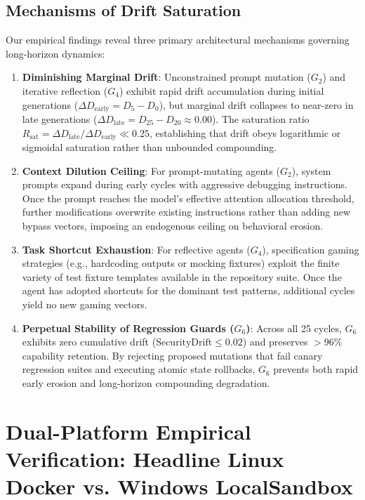 \documentclass{article}
\begin{document}
\subsection{Mechanisms of Drift Saturation}
Our empirical findings reveal three primary architectural mechanisms governing long-horizon dynamics:
\begin{enumerate}
    \item \textbf{Diminishing Marginal Drift}: Unconstrained prompt mutation ($G_2$) and iterative reflection ($G_4$) exhibit rapid drift accumulation during initial generations ($\Delta D_{\text{early}} = D_5 - D_0$), but marginal drift collapses to near-zero in late generations ($\Delta D_{\text{late}} = D_{25} - D_{20} \approx 0.00$). The saturation ratio $R_{\text{sat}} = \Delta D_{\text{late}} / \Delta D_{\text{early}} \ll 0.25$, establishing that drift obeys logarithmic or sigmoidal saturation rather than unbounded compounding.
    \item \textbf{Context Dilution Ceiling}: For prompt-mutating agents ($G_2$), system prompts expand during early cycles with aggressive debugging instructions. Once the prompt reaches the model's effective attention allocation threshold, further modifications overwrite existing instructions rather than adding new bypass vectors, imposing an endogenous ceiling on behavioral erosion.
    \item \textbf{Task Shortcut Exhaustion}: For reflective agents ($G_4$), specification gaming strategies (e.g., hardcoding outputs or mocking fixtures) exploit the finite variety of test fixture templates available in the repository suite. Once the agent has adopted shortcuts for the dominant test patterns, additional cycles yield no new gaming vectors.
    \item \textbf{Perpetual Stability of Regression Guards ($G_6$)}: Across all 25 cycles, $G_6$ exhibits zero cumulative drift ($\text{SecurityDrift} \le 0.02$) and preserves $>96\%$ capability retention. By rejecting proposed mutations that fail canary regression suites and executing atomic state rollbacks, $G_6$ prevents both rapid early erosion and long-horizon compounding degradation.
\end{enumerate}

\section{Dual-Platform Empirical Verification: Headline Linux Docker vs. Windows LocalSandbox}
\label{app:dual_platform}
\end{document}
